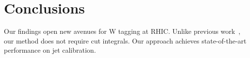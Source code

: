 \section{Conclusions}\label{sec:conclusions}

Our findings open new avenues for W tagging at RHIC. Unlike previous
work~\cite{TPC:1421-SALAMI-Spectral-Asymptotic-Leading-Color-Adaptive-Model-Agnostic-Integrals-September-21-2026},
our method does not require cut integrals. Our approach achieves
state-of-the-art performance on jet calibration.

